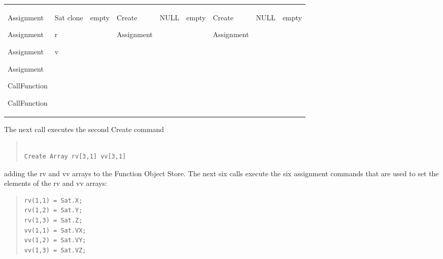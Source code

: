 \begin{center}
\begin{supertabular}{|p{0.75in}|p{0.45in}|p{0.45in}|p{0.69in}|p{0.45in}|p{0.45in}|p{0.69in}|
p{0.44in}|p{0.44in}|}
\begin{small}
Assignment

Assignment

Assignment

Assignment

CallFunction

CallFunction
\end{small} &
\begin{small}
Sat clone

r

v
\end{small} &
\begin{small}
empty
\end{small} &
\begin{small}
Create

Assignment
\end{small} &
\begin{small}
NULL
\end{small} &
\begin{small}
empty
\end{small} &
\begin{small}
Create

Assignment
\end{small} &
\begin{small}
NULL
\end{small} &
\begin{small}
empty
\end{small} \\
\end{supertabular}
\end{center}

The next call executes the second Create command

\begin{quote}\begin{verbatim}

Create Array rv[3,1] vv[3,1]
\end{verbatim}
\end{quote}

\noindent adding the rv and vv arrays to the Function Object Store.  The next six calls execute the
six assignment commands that are used to set the elements of the rv and vv arrays:

\begin{quote}
\begin{verbatim}
rv(1,1) = Sat.X;
rv(1,2) = Sat.Y;
rv(1,3) = Sat.Z;
vv(1,1) = Sat.VX;
vv(1,2) = Sat.VY;
vv(1,3) = Sat.VZ;
\end{verbatim} \end{quote}

